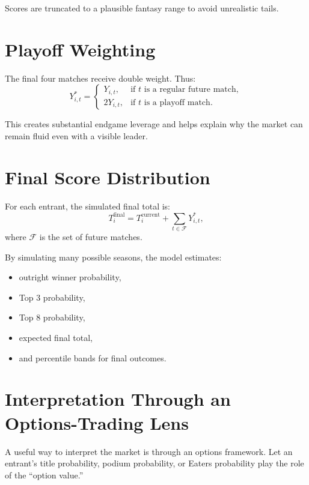 \documentclass[11pt]{article}
\begin{document}
Scores are truncated to a plausible fantasy range to avoid unrealistic tails.

\section{Playoff Weighting}

The final four matches receive double weight. Thus:
\begin{equation}
Y_{i,t}^{*} =
\begin{cases}
Y_{i,t}, & \text{if } t \text{ is a regular future match},\\
2Y_{i,t}, & \text{if } t \text{ is a playoff match}.
\end{cases}
\end{equation}

This creates substantial endgame leverage and helps explain why the market can remain fluid even with a visible leader.

\section{Final Score Distribution}

For each entrant, the simulated final total is:
\begin{equation}
T_i^{\text{final}}
=
T_i^{\text{current}}
+
\sum_{t \in \mathcal{F}} Y_{i,t}^{*},
\end{equation}
where $\mathcal{F}$ is the set of future matches.

By simulating many possible seasons, the model estimates:
\begin{itemize}[itemsep=2pt]
    \item outright winner probability,
    \item Top 3 probability,
    \item Top 8 probability,
    \item expected final total,
    \item and percentile bands for final outcomes.
\end{itemize}

\section{Interpretation Through an Options-Trading Lens}

A useful way to interpret the market is through an options framework. Let an entrant's title probability, podium probability, or Eaters probability play the role of the ``option value.''
\end{document}

